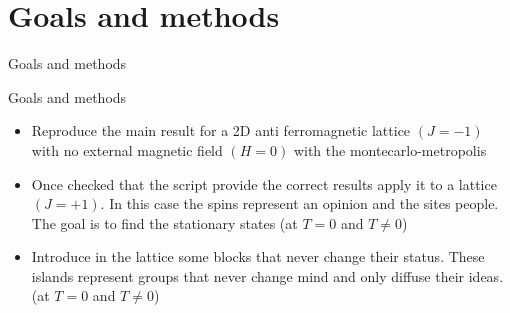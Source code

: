 \documentclass{beamer}
\begin{document}
\section{Goals and methods}

\begin{frame}
\begin{center}
{\Huge Goals and methods}
\end{center}
\end{frame}

\begin{frame}{Goals and methods}
\begin{itemize}
\item Reproduce the main result for a 2D anti ferromagnetic lattice $(J=-1)$ with no external magnetic field $(H=0)$ with the montecarlo-metropolis
\item  Once checked that the script provide the correct results apply it to a lattice $(J=+1)$.  In this case the spins represent an opinion and the sites people.  The goal is to find the stationary states (at $T=0$ and $T\neq0$)
\item Introduce in the lattice some blocks that never change their status.  These islands represent groups that never change mind and only diffuse their ideas.  (at $T=0$ and $T\neq0$)
\end{itemize}
\end{frame}
\end{document}
